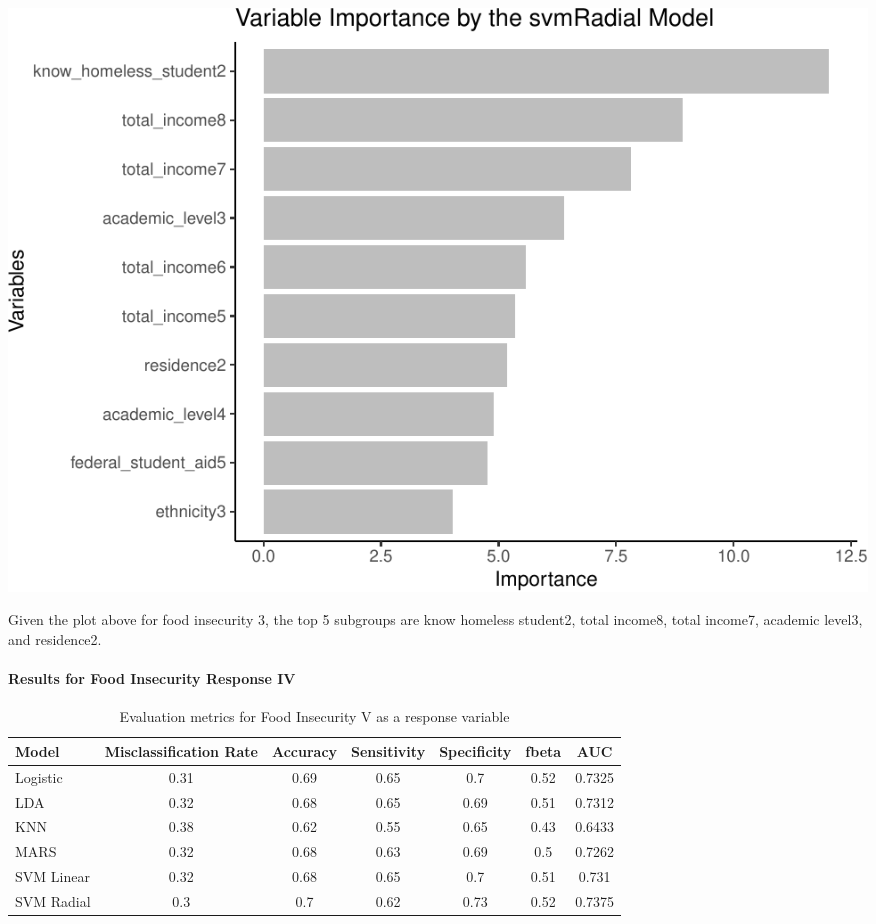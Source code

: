 \documentclass[
  10pt,
]{article}
\begin{document}
\begin{center}\includegraphics{phase2_report_files/figure-latex/unnamed-chunk-28-1} \end{center}

\hfill\break
Given the plot above for food insecurity 3, the top 5 subgroups are know homeless student2, total income8, total income7, academic level3, and residence2.

\hypertarget{results-for-food-insecurity-response-iv}{%
\paragraph{Results for Food Insecurity Response IV}\label{results-for-food-insecurity-response-iv}}

\newline

\begin{table}[H]

\caption{\label{tab:unnamed-chunk-29}Evaluation metrics for Food Insecurity V  as a response variable}
\centering
\fontsize{12}{14}\selectfont
\begin{tabular}[t]{lcccccc}
\toprule
Model & Misclassification Rate & Accuracy & Sensitivity & Specificity & fbeta & AUC\\
\midrule
Logistic & 0.31 & 0.69 & 0.65 & 0.7 & 0.52 & 0.7325\\
LDA & 0.32 & 0.68 & 0.65 & 0.69 & 0.51 & 0.7312\\
KNN & 0.38 & 0.62 & 0.55 & 0.65 & 0.43 & 0.6433\\
MARS & 0.32 & 0.68 & 0.63 & 0.69 & 0.5 & 0.7262\\
SVM Linear & 0.32 & 0.68 & 0.65 & 0.7 & 0.51 & 0.731\\
SVM Radial & 0.3 & 0.7 & 0.62 & 0.73 & 0.52 & 0.7375\\
\bottomrule
\end{tabular}
\end{table}
\end{document}
